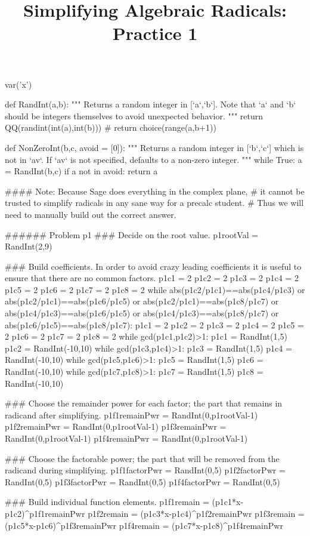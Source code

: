 \documentclass{ximera}
\title{Simplifying Algebraic Radicals: Practice 1}
\begin{document}
\begin{sagesilent}
var('x')

def RandInt(a,b):
    """ Returns a random integer in [`a`,`b`]. Note that `a` and `b` should be integers themselves to avoid unexpected behavior.
    """
    return QQ(randint(int(a),int(b)))
    # return choice(range(a,b+1))

def NonZeroInt(b,c, avoid = [0]):
    """ Returns a random integer in [`b`,`c`] which is not in `av`. 
        If `av` is not specified, defaults to a non-zero integer.
    """
    while True:
        a = RandInt(b,c)
        if a not in avoid:
            return a


#### Note: Because Sage does everything in the complex plane, 
#           it cannot be trusted to simplify radicals in any sane way for a precalc student.
#           Thus we will need to manually build out the correct answer.

###### Problem p1
### Decide on the root value.
p1rootVal = RandInt(2,9)

### Build coefficients. In order to avoid crazy leading coefficients it is useful to ensure that there are no common factors.
p1c1 = 2
p1c2 = 2
p1c3 = 2
p1c4 = 2
p1c5 = 2
p1c6 = 2
p1c7 = 2
p1c8 = 2
while abs(p1c2/p1c1)==abs(p1c4/p1c3) or abs(p1c2/p1c1)==abs(p1c6/p1c5) or abs(p1c2/p1c1)==abs(p1c8/p1c7) or abs(p1c4/p1c3)==abs(p1c6/p1c5) or abs(p1c4/p1c3)==abs(p1c8/p1c7) or abs(p1c6/p1c5)==abs(p1c8/p1c7):
    p1c1 = 2
    p1c2 = 2
    p1c3 = 2
    p1c4 = 2
    p1c5 = 2
    p1c6 = 2
    p1c7 = 2
    p1c8 = 2
    while gcd(p1c1,p1c2)>1:
        p1c1 = RandInt(1,5)
        p1c2 = RandInt(-10,10)
    while gcd(p1c3,p1c4)>1:
        p1c3 = RandInt(1,5)
        p1c4 = RandInt(-10,10)
    while gcd(p1c5,p1c6)>1:
        p1c5 = RandInt(1,5)
        p1c6 = RandInt(-10,10)
    while gcd(p1c7,p1c8)>1:
        p1c7 = RandInt(1,5)
        p1c8 = RandInt(-10,10)

### Choose the remainder power for each factor; the part that remains in radicand after simplifying.
p1f1remainPwr = RandInt(0,p1rootVal-1)
p1f2remainPwr = RandInt(0,p1rootVal-1)
p1f3remainPwr = RandInt(0,p1rootVal-1)
p1f4remainPwr = RandInt(0,p1rootVal-1)

### Choose the factorable power; the part that will be removed from the radicand during simplifying.
p1f1factorPwr = RandInt(0,5)
p1f2factorPwr = RandInt(0,5)
p1f3factorPwr = RandInt(0,5)
p1f4factorPwr = RandInt(0,5)

### Build individual function elements.
p1f1remain = (p1c1*x-p1c2)^p1f1remainPwr
p1f2remain = (p1c3*x-p1c4)^p1f2remainPwr
p1f3remain = (p1c5*x-p1c6)^p1f3remainPwr
p1f4remain = (p1c7*x-p1c8)^p1f4remainPwr


\end{sagesilent}
\end{document}
